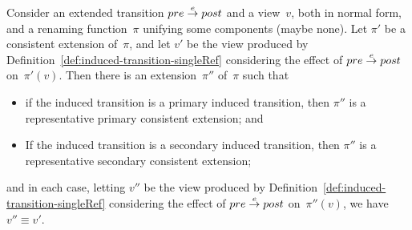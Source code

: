 

\begin{prop}
Consider an extended transition $pre \stackrel{e}\rightarrow post$ and a view~$v$, both in
normal form, and a renaming function~$\pi$ unifying some components (maybe
none).  Let $\pi'$ be a consistent extension of~$\pi$, and let $v'$ be the
view produced by Definition~\ref{def:induced-transition-singleRef} considering
the effect of $pre \stackrel{e}\rightarrow post$ on~$\pi'(v)$.
%
Then there is an extension~$\pi''$ of~$\pi$ such that
%
\begin{itemize}
\item if the induced transition is a primary induced transition, then $\pi''$
  is a representative primary consistent extension; and

\item If the induced transition is a secondary induced transition, then $\pi''$
  is a representative secondary consistent extension; 
\end{itemize}
and in each case, letting $v''$ be the view produced by
Definition~\ref{def:induced-transition-singleRef} considering the effect of
$pre \stackrel{e}\rightarrow post$ on~$\pi''(v)$, we have $v'' \equiv v'$.
\end{prop}



